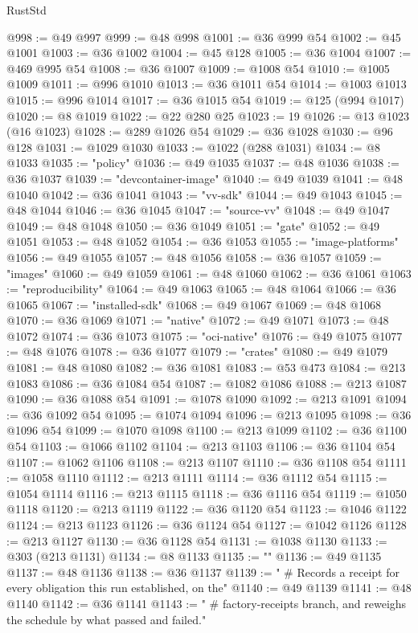 \begin{lexlean}{RustStd}
\begin{coremodule}
@998 := @49 @997
@999 := @48 @998
@1001 := @36 @999 @54
@1002 := @45 @1001
@1003 := @36 @1002
@1004 := @45 @128
@1005 := @36 @1004
@1007 := @469 @995 @54
@1008 := @36 @1007
@1009 := @1008 @54
@1010 := @1005 @1009
@1011 := @996 @1010
@1013 := @36 @1011 @54
@1014 := @1003 @1013
@1015 := @996 @1014
@1017 := @36 @1015 @54
@1019 := @125 (@994 @1017)
@1020 := @8 @1019
@1022 := @22 @280 @25
@1023 := 19
@1026 := @13 @1023 (@16 @1023)
@1028 := @289 @1026 @54
@1029 := @36 @1028
@1030 := @96 @128
@1031 := @1029 @1030
@1033 := @1022 (@288 @1031)
@1034 := @8 @1033
@1035 := "policy"
@1036 := @49 @1035
@1037 := @48 @1036
@1038 := @36 @1037
@1039 := "devcontainer-image"
@1040 := @49 @1039
@1041 := @48 @1040
@1042 := @36 @1041
@1043 := "vv-sdk"
@1044 := @49 @1043
@1045 := @48 @1044
@1046 := @36 @1045
@1047 := "source-vv"
@1048 := @49 @1047
@1049 := @48 @1048
@1050 := @36 @1049
@1051 := "gate"
@1052 := @49 @1051
@1053 := @48 @1052
@1054 := @36 @1053
@1055 := "image-platforms"
@1056 := @49 @1055
@1057 := @48 @1056
@1058 := @36 @1057
@1059 := "images"
@1060 := @49 @1059
@1061 := @48 @1060
@1062 := @36 @1061
@1063 := "reproducibility"
@1064 := @49 @1063
@1065 := @48 @1064
@1066 := @36 @1065
@1067 := "installed-sdk"
@1068 := @49 @1067
@1069 := @48 @1068
@1070 := @36 @1069
@1071 := "native"
@1072 := @49 @1071
@1073 := @48 @1072
@1074 := @36 @1073
@1075 := "oci-native"
@1076 := @49 @1075
@1077 := @48 @1076
@1078 := @36 @1077
@1079 := "crates"
@1080 := @49 @1079
@1081 := @48 @1080
@1082 := @36 @1081
@1083 := @53 @473
@1084 := @213 @1083
@1086 := @36 @1084 @54
@1087 := @1082 @1086
@1088 := @213 @1087
@1090 := @36 @1088 @54
@1091 := @1078 @1090
@1092 := @213 @1091
@1094 := @36 @1092 @54
@1095 := @1074 @1094
@1096 := @213 @1095
@1098 := @36 @1096 @54
@1099 := @1070 @1098
@1100 := @213 @1099
@1102 := @36 @1100 @54
@1103 := @1066 @1102
@1104 := @213 @1103
@1106 := @36 @1104 @54
@1107 := @1062 @1106
@1108 := @213 @1107
@1110 := @36 @1108 @54
@1111 := @1058 @1110
@1112 := @213 @1111
@1114 := @36 @1112 @54
@1115 := @1054 @1114
@1116 := @213 @1115
@1118 := @36 @1116 @54
@1119 := @1050 @1118
@1120 := @213 @1119
@1122 := @36 @1120 @54
@1123 := @1046 @1122
@1124 := @213 @1123
@1126 := @36 @1124 @54
@1127 := @1042 @1126
@1128 := @213 @1127
@1130 := @36 @1128 @54
@1131 := @1038 @1130
@1133 := @303 (@213 @1131)
@1134 := @8 @1133
@1135 := ""
@1136 := @49 @1135
@1137 := @48 @1136
@1138 := @36 @1137
@1139 := "  # Records a receipt for every obligation this run established, on the"
@1140 := @49 @1139
@1141 := @48 @1140
@1142 := @36 @1141
@1143 := "  # factory-receipts branch, and reweighs the schedule by what passed and failed."

\end{coremodule}
\end{lexlean}
